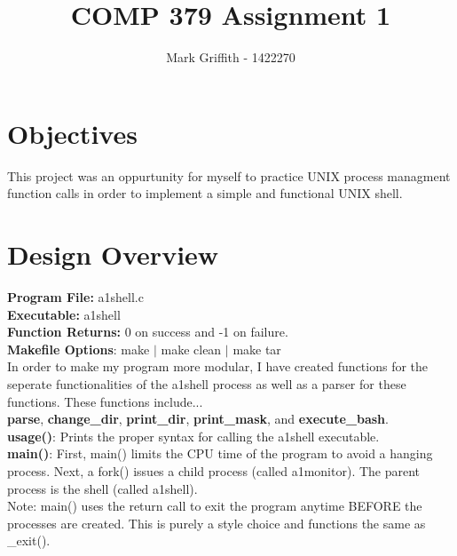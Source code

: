 \documentclass{article}
\begin{document}
\title{COMP 379 Assignment 1}
\author{Mark Griffith - 1422270}

\maketitle

\section{Objectives}
This project was an oppurtunity for myself to practice UNIX process managment function calls
in order to implement a simple and functional UNIX shell.


\section{Design Overview}
\textbf{Program File:} a1shell.c \\
\textbf{Executable:} a1shell \\
\textbf{Function Returns:} 0 on success and -1 on failure. \\
\textbf{Makefile Options}: make $|$ make clean $|$ make tar \\

\noindent
In order to make my program more modular, I have created functions
for the seperate functionalities of the a1shell process as well as
a parser for these functions. These functions include... \\
\textbf{parse}, \textbf{change\_dir}, \textbf{print\_dir}, \textbf{print\_mask},
and \textbf{execute\_bash}. \\

\noindent
\textbf{usage()}: Prints the proper syntax for calling the a1shell executable. \\

\noindent
\textbf{main()}: First, main() limits the CPU time of the program to avoid a hanging
process.
Next, a fork() issues a child process (called a1monitor). The parent process is the
shell (called a1shell). \\
\noindent
Note: main() uses the return call to exit the program anytime BEFORE the processes
are created. This is purely a style choice and functions the same as \_exit(). \\
\end{document}
